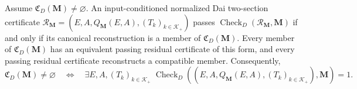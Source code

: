 Assume \(\mathfrak C_D(\mathbf M)\ne\varnothing\).  An input-conditioned normalized Dai two-section certificate \(\mathcal R_{\mathbf M}=(E,A,Q_{\mathbf M}(E,A),(T_k)_{k\in\mathcal K_+})\) passes \(\operatorname{Check}_{D}(\mathcal R_{\mathbf M},\mathbf M)\) if and only if its canonical reconstruction is a member of \(\mathfrak C_D(\mathbf M)\).  Every member of \(\mathfrak C_D(\mathbf M)\) has an equivalent passing residual certificate of this form, and every passing residual certificate reconstructs a compatible member.  Consequently,
\[
\mathfrak C_D(\mathbf M)\ne\varnothing
\quad\Longleftrightarrow\quad
\exists E,A,(T_k)_{k\in\mathcal K_+}\;
\operatorname{Check}_{D}\!\left(
(E,A,Q_{\mathbf M}(E,A),(T_k)_{k\in\mathcal K_+}),\mathbf M
\right)=1.
\]